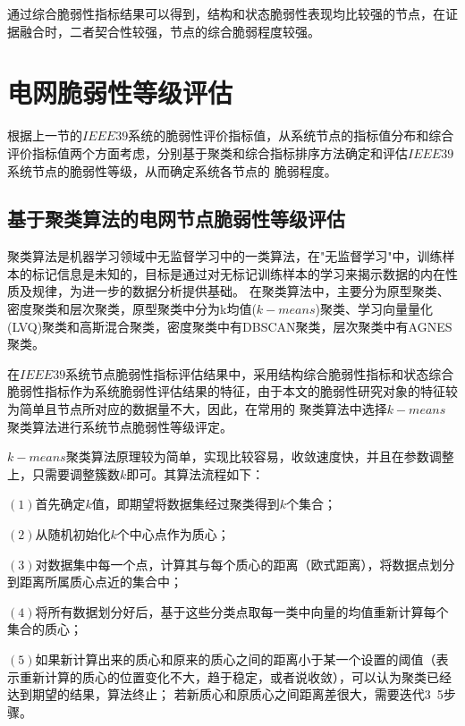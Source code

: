 通过综合脆弱性指标结果可以得到，结构和状态脆弱性表现均比较强的节点，在证据融合时，二者契合性较强，节点的综合脆弱程度较强。




\section{电网脆弱性等级评估}
\label{sec:multiAssessment}
根据上一节的$IEEE39$系统的脆弱性评价指标值，从系统节点的指标值分布和综合评价指标值两个方面考虑，分别基于聚类和综合指标排序方法确定和评估$IEEE39$系统节点的脆弱性等级，从而确定系统各节点的
脆弱程度。

\subsection{基于聚类算法的电网节点脆弱性等级评估}
\label{sec:K_means1}

聚类算法是机器学习领域中无监督学习中的一类算法，在"无监督学习"中，训练样本的标记信息是未知的，目标是通过对无标记训练样本的学习来揭示数据的内在性质及规律，为进一步的数据分析提供基础\cite{refs82}。
在聚类算法中，主要分为原型聚类、密度聚类和层次聚类，原型聚类中分为k均值($k-means$)聚类、学习向量量化(LVQ)聚类和高斯混合聚类，密度聚类中有DBSCAN聚类，层次聚类中有AGNES聚类。

在$IEEE39$系统节点脆弱性指标评估结果中，采用结构综合脆弱性指标和状态综合脆弱性指标作为系统脆弱性评估结果的特征，由于本文的脆弱性研究对象的特征较为简单且节点所对应的数据量不大，因此，在常用的
聚类算法中选择$k-means$聚类算法进行系统节点脆弱性等级评定。

$k-means$聚类算法原理较为简单，实现比较容易，收敛速度快，并且在参数调整上，只需要调整簇数$k$即可。其算法流程如下：

$(1)$首先确定$k$值，即期望将数据集经过聚类得到$k$个集合；

$(2)$从随机初始化$k$个中心点作为质心；

$(3)$对数据集中每一个点，计算其与每个质心的距离（欧式距离），将数据点划分到距离所属质心点近的集合中；

$(4)$将所有数据划分好后，基于这些分类点取每一类中向量的均值重新计算每个集合的质心；

$(5)$如果新计算出来的质心和原来的质心之间的距离小于某一个设置的阈值（表示重新计算的质心的位置变化不大，趋于稳定，或者说收敛），可以认为聚类已经达到期望的结果，算法终止；
若新质心和原质心之间距离差很大，需要迭代3~5步骤。

